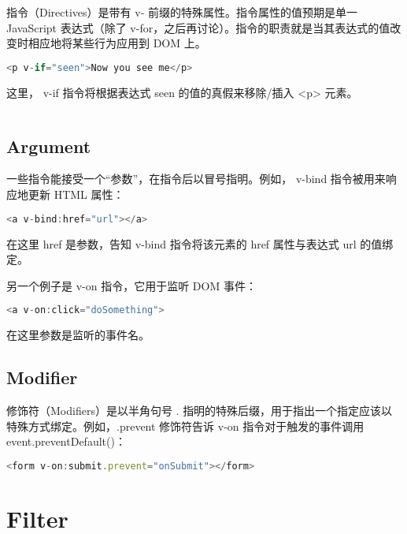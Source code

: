 指令（Directives）是带有 v- 前缀的特殊属性。指令属性的值预期是单一 JavaScript 表达式（除了 v-for，之后再讨论）。指令的职责就是当其表达式的值改变时相应地将某些行为应用到 DOM 上。

\begin{lstlisting}[language=JavaScript]
<p v-if="seen">Now you see me</p>
\end{lstlisting}

这里， v-if 指令将根据表达式 seen 的值的真假来移除/插入 <p> 元素。


\begin{lstlisting}[language=JavaScript]

\end{lstlisting}




\subsection{Argument}

一些指令能接受一个“参数”，在指令后以冒号指明。例如， v-bind 指令被用来响应地更新 HTML 属性：

\begin{lstlisting}[language=JavaScript]
<a v-bind:href="url"></a>
\end{lstlisting}

在这里 href 是参数，告知 v-bind 指令将该元素的 href 属性与表达式 url 的值绑定。

另一个例子是 v-on 指令，它用于监听 DOM 事件：

\begin{lstlisting}[language=JavaScript]
<a v-on:click="doSomething">
\end{lstlisting}

在这里参数是监听的事件名。

\subsection{Modifier}

修饰符（Modifiers）是以半角句号 . 指明的特殊后缀，用于指出一个指定应该以特殊方式绑定。例如，.prevent 修饰符告诉 v-on 指令对于触发的事件调用 event.preventDefault()：

\begin{lstlisting}[language=JavaScript]
<form v-on:submit.prevent="onSubmit"></form>
\end{lstlisting}


\section{Filter}

